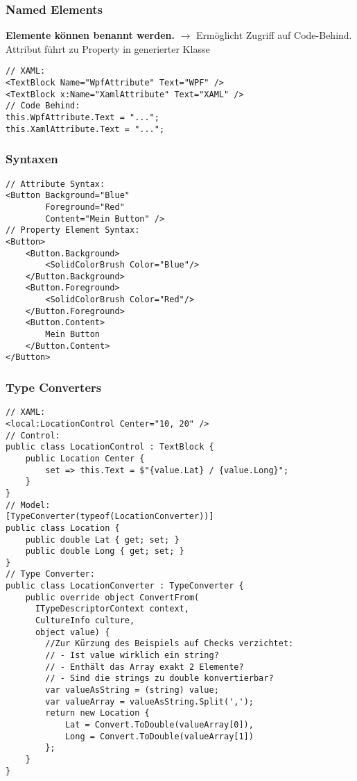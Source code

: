 \subsubsection{Named Elements}
\textbf{Elemente können benannt werden.} $\rightarrow$ Ermöglicht Zugriff auf Code-Behind. Attribut führt zu Property in generierter Klasse
\begin{lstlisting}
// XAML:
<TextBlock Name="WpfAttribute" Text="WPF" />
<TextBlock x:Name="XamlAttribute" Text="XAML" />
// Code Behind:
this.WpfAttribute.Text = "...";
this.XamlAttribute.Text = "...";
\end{lstlisting}
\subsubsection{Syntaxen}
\begin{lstlisting}
// Attribute Syntax:
<Button Background="Blue"
        Foreground="Red"
        Content="Mein Button" />
// Property Element Syntax:
<Button>
    <Button.Background>
        <SolidColorBrush Color="Blue"/>
    </Button.Background>
    <Button.Foreground>
        <SolidColorBrush Color="Red"/>
    </Button.Foreground>
    <Button.Content>
        Mein Button
    </Button.Content>
</Button>
\end{lstlisting}
\subsubsection{Type Converters}
\begin{lstlisting}
// XAML:
<local:LocationControl Center="10, 20" />
// Control:
public class LocationControl : TextBlock {
    public Location Center {
        set => this.Text = $"{value.Lat} / {value.Long}";
    }
}
// Model:
[TypeConverter(typeof(LocationConverter))]
public class Location {
    public double Lat { get; set; }
    public double Long { get; set; }
}
// Type Converter:
public class LocationConverter : TypeConverter {
    public override object ConvertFrom(
      ITypeDescriptorContext context,
      CultureInfo culture,
      object value) {
        //Zur Kürzung des Beispiels auf Checks verzichtet:
        // - Ist value wirklich ein string?
        // - Enthält das Array exakt 2 Elemente?
        // - Sind die strings zu double konvertierbar?
        var valueAsString = (string) value;
        var valueArray = valueAsString.Split(',');
        return new Location {
            Lat = Convert.ToDouble(valueArray[0]),
            Long = Convert.ToDouble(valueArray[1])
        };
    }
}
\end{lstlisting}
